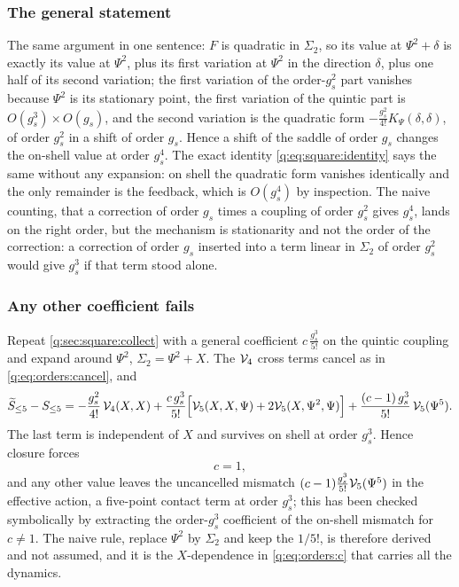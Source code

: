 \subsubsection{The general statement}
\label{q:sec:orders:general}

The same argument in one sentence: $F$ is quadratic in $\Sigma_2$, so its value at $\Psi^2+\delta$ is exactly its value at $\Psi^2$, plus its first variation at $\Psi^2$ in the direction $\delta$, plus one half of its second variation; the first variation of the order-$g_s^2$ part vanishes because $\Psi^2$ is its stationary point, the first variation of the quintic part is $O(g_s^3)\times O(g_s)$, and the second variation is the quadratic form $-\frac{g_s^2}{4!}K_\Psi(\delta,\delta)$, of order $g_s^2$ in a shift of order $g_s$.
Hence a shift of the saddle of order $g_s$ changes the on-shell value at order $g_s^4$.
The exact identity \eqref{q:eq:square:identity} says the same without any expansion: on shell the quadratic form vanishes identically and the only remainder is the feedback, which is $O(g_s^4)$ by inspection.
The naive counting, that a correction of order $g_s$ times a coupling of order $g_s^2$ gives $g_s^4$, lands on the right order, but the mechanism is stationarity and not the order of the correction: a correction of order $g_s$ inserted into a term linear in $\Sigma_2$ of order $g_s^2$ would give $g_s^3$ if that term stood alone.

\subsubsection{Any other coefficient fails}
\label{q:sec:orders:falsify}

Repeat \cref{q:sec:square:collect} with a general coefficient $c\,\frac{g_s^3}{5!}$ on the quintic coupling and expand around $\Psi^2$, $\Sigma_2=\Psi^2+X$.
The ${\mathcal{V}}_4$ cross terms cancel as in \eqref{q:eq:orders:cancel}, and
\begin{equation}
  \label{q:eq:orders:c}
  \widetilde S_{\le 5} - S_{\le 5}
    = - \frac{g_s^2}{4!} \, {\mathcal{V}}_4(X, X)
      + \frac{c \, g_s^3}{5!} \Big[ {\mathcal{V}}_5(X, X, \Psi) + 2 {\mathcal{V}}_5(X, \Psi^2, \Psi) \Big]
      + \frac{(c - 1) \, g_s^3}{5!} \, {\mathcal{V}}_5(\Psi^5).
\end{equation}
The last term is independent of $X$ and survives on shell at order $g_s^3$.
Hence closure forces
\begin{equation}
  \boxed{\;
  c = 1,
  \;}
\end{equation}
and any other value leaves the uncancelled mismatch $(c-1)\frac{g_s^3}{5!}{\mathcal{V}}_5(\Psi^5)$ in the effective action, a five-point contact term at order $g_s^3$; this has been checked symbolically by extracting the order-$g_s^3$ coefficient of the on-shell mismatch for $c\neq1$.
The naive rule, replace $\Psi^2$ by $\Sigma_2$ and keep the $1/5!$, is therefore derived and not assumed, and it is the $X$-dependence in \eqref{q:eq:orders:c} that carries all the dynamics.
